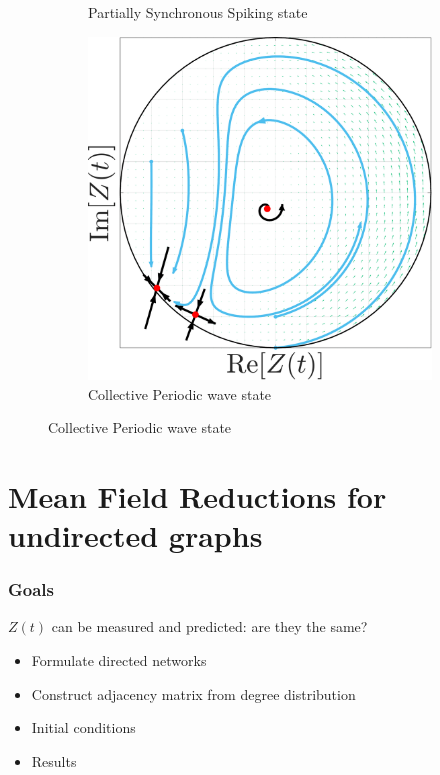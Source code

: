 \begin{frame}
\begin{figure}[H]
\begin{subfigure}[b]{0.32\linewidth}
  \caption{Partially Synchronous Spiking state}
   \label{fig:MFRPSS}
\end{subfigure} \hfill
\begin{subfigure}[b]{0.32\linewidth}
   \centering
  \includegraphics[width=\linewidth]{../Figures/PhaseSpace/MFRCPW.pdf}
  \caption{Collective Periodic wave state}
   \label{fig:MFRCPW}
\end{subfigure}
   \label{fig:macroscopicstatesfixeddegree}
\end{figure}
\end{frame}

\section{\mywork Mean Field Reductions for undirected graphs} 
\begin{frame}
\frametitle{Goals} 
$Z(t)$ can be measured and predicted: are they the same? \\
\begin{itemize}[<+(1)->]
\item Formulate directed networks \\
\item Construct adjacency matrix from degree distribution \\
\item Initial conditions \\
\item Results 
\end{itemize}
\end{frame}

